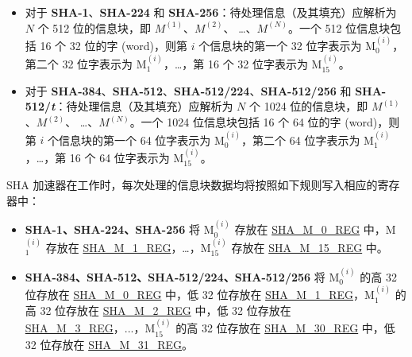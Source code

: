 \documentclass[main\_\_CN.tex]{subfiles}
\begin{document}
\begin{itemize}
    \item 对于 \textbf{SHA-1}、\textbf{SHA-224} 和 \textbf{SHA-256}：待处理信息（及其填充）应解析为 \begin{math}N\end{math} 个 512 位的信息块，即 \begin{math}M^{(1)}\end{math}、\begin{math}M^{(2)}\end{math}、 \dots、\begin{math}M^{(N)}\end{math}。一个 512 位信息块包括 16 个 32 位的字 (word)，则第 \begin{math}i\end{math} 个信息块的第一个 32 位字表示为 M$^{(i)}_{0}$，第二个 32 位字表示为 M$^{(i)}_{1}$，\dots，第 16 个 32 位字表示为 M$^{(i)}_{15}$。
    \item 对于 \textbf{SHA-384}、\textbf{SHA-512}、\textbf{SHA-512/224}、\textbf{SHA-512/256} 和 \textbf{SHA-512/\it{t}}：待处理信息（及其填充）应解析为 \begin{math}N\end{math} 个 1024 位的信息块，即 \begin{math}M^{(1)}\end{math}、\begin{math}M^{(2)}\end{math}、 \dots、\begin{math}M^{(N)}\end{math}。一个 1024 位信息块包括 16 个 64 位的字 (word)，则第 \begin{math}i\end{math} 个信息块的第一个 64 位字表示为 M$^{(i)}_{0}$，第二个 64 位字表示为 M$^{(i)}_{1}$，\dots，第 16 个 64 位字表示为 M$^{(i)}_{15}$。
\end{itemize}

SHA 加速器在工作时，每次处理的信息块数据均将按照如下规则写入相应的寄存器中：
\begin{itemize}
    \item \textbf{SHA-1、SHA-224、SHA-256} 将 M$^{(i)}_{0}$ 存放在 \hyperref[regdesc:SHAMNREG]{SHA\_M\_0\_REG} 中，M$^{(i)}_1$ 存放在 \hyperref[regdesc:SHAMNREG]{SHA\_M\_1\_REG}，\dots，M$^{(i)}_{15}$ 存放在 \hyperref[regdesc:SHAMNREG]{SHA\_M\_15\_REG} 中。
    \item \textbf{SHA-384、SHA-512、SHA-512/224、SHA-512/256} 将 M$^{(i)}_0 $ 的高 32 位存放在 \hyperref[regdesc:SHAMNREG]{SHA\_M\_0\_REG} 中，低 32 位存放在 \hyperref[regdesc:SHAMNREG]{SHA\_M\_1\_REG}，M$^{(i)}_1 $ 的高 32 位存放在 \hyperref[regdesc:SHAMNREG]{SHA\_M\_2\_REG} 中，低 32 位存放在 \hyperref[regdesc:SHAMNREG]{SHA\_M\_3\_REG}，...，M$^{(i)}_{15}$ 的高 32 位存放在 \hyperref[regdesc:SHAMNREG]{SHA\_M\_30\_REG} 中，低 32 位存放在 \hyperref[regdesc:SHAMNREG]{SHA\_M\_31\_REG}。

\end{itemize}
\end{document}
